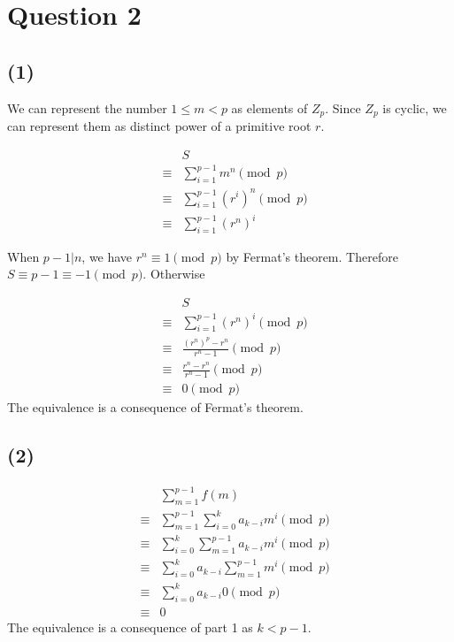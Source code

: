 \documentclass{article}
\begin{document}
\section*{Question 2}
\subsection*{(1)}
We can represent the number $ 1 \le m < p $ as elements of $ Z_p $. Since $ Z_p $ is cyclic, we can represent them as distinct power of a primitive root $ r $.

\begin{eqnarray*}
  &      & S                                         \\
  &\equiv& \sum\limits_{i = 1}^{p-1}m^n     \pmod{p} \\
  &\equiv& \sum\limits_{i = 1}^{p-1}(r^i)^n \pmod{p} \\
  &\equiv& \sum\limits_{i = 1}^{p-1}(r^n)^i
\end{eqnarray*}

When $ p - 1 | n $, we have $ r^n \equiv 1 \pmod{p} $ by Fermat's theorem. Therefore $ S \equiv p - 1 \equiv -1 \pmod{p} $. Otherwise

\begin{eqnarray*}
  & & S                                              \\
  &\equiv& \sum\limits_{i = 1}^{p-1}(r^n)^i \pmod{p} \\
  &\equiv& \frac{(r^n)^p - r^n}{r^n - 1}    \pmod{p} \\
  &\equiv& \frac{r^n - r^n}{r^n - 1}        \pmod{p} \\
  &\equiv& 0                                \pmod{p} 
\end{eqnarray*}
The  equivalence is a consequence of Fermat's theorem.
\subsection*{(2)}
\begin{eqnarray*}
  &      & \sum\limits_{m = 1}^{p-1}f(m) \\
  &\equiv& \sum\limits_{m = 1}^{p-1}\sum\limits_{i = 0}^{k}a_{k-i} m^i \pmod{p} \\
  &\equiv& \sum\limits_{i = 0}^{k}\sum\limits_{m = 1}^{p-1}a_{k-i} m^i \pmod{p} \\
  &\equiv& \sum\limits_{i = 0}^{k}a_{k-i}\sum\limits_{m = 1}^{p-1} m^i \pmod{p} \\
  &\equiv& \sum\limits_{i = 0}^{k}a_{k-i} 0 \pmod{p} \\
  &\equiv& 0
\end{eqnarray*}
The  equivalence is a consequence of part 1 as $ k < p - 1 $.
\end{document}
